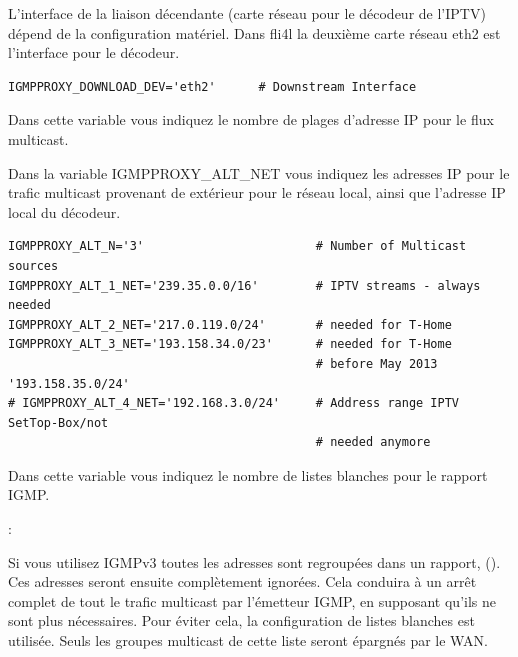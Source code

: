 \begin{description}

L'interface de la liaison décendante (carte réseau pour le décodeur de l'IPTV) dépend de la
configuration matériel. Dans fli4l la deuxième carte réseau eth2 est l'interface pour le décodeur.

\begin{example}
\begin{verbatim}
IGMPPROXY_DOWNLOAD_DEV='eth2'      # Downstream Interface
\end{verbatim}
\end{example}


Dans cette variable vous indiquez le nombre de plages d'adresse IP pour le flux multicast.


Dans la variable IGMPPROXY\_ALT\_NET vous indiquez les adresses IP pour le trafic multicast
provenant de extérieur pour le réseau local, ainsi que l'adresse IP local du décodeur.

\begin{example}
\begin{verbatim}
IGMPPROXY_ALT_N='3'                        # Number of Multicast sources
IGMPPROXY_ALT_1_NET='239.35.0.0/16'        # IPTV streams - always needed
IGMPPROXY_ALT_2_NET='217.0.119.0/24'       # needed for T-Home
IGMPPROXY_ALT_3_NET='193.158.34.0/23'      # needed for T-Home
                                           # before May 2013 '193.158.35.0/24'
# IGMPPROXY_ALT_4_NET='192.168.3.0/24'     # Address range IPTV SetTop-Box/not
                                           # needed anymore
\end{verbatim}
\end{example}


Dans cette variable vous indiquez le nombre de listes blanches pour le rapport IGMP.

:\newline

Si vous utilisez IGMPv3 toutes les adresses sont regroupées dans un rapport,
(). 
Ces adresses seront ensuite complètement ignorées. Cela conduira à un arrêt complet
de tout le trafic multicast par l'émetteur IGMP, en supposant qu'ils ne sont plus
nécessaires. Pour éviter cela, la configuration de listes blanches est utilisée.
Seuls les groupes multicast de cette liste seront épargnés par le WAN.


\end{description}
